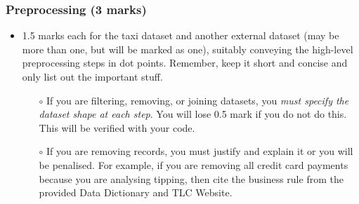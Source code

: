 \documentclass[12pt]{article}
\begin{document}
\subsubsection*{Preprocessing (3 marks)}
\begin{itemize} 
    \item 1.5 marks each for the taxi dataset and another external dataset (may be more than one, but will be marked as one), suitably conveying the high-level preprocessing steps in dot points. Remember, keep it short and concise and only list out the important stuff.
    \begin{itemize}
        \item[$\circ$] If you are filtering, removing, or joining datasets, you \emph{must specify the dataset shape at each step}. You will lose 0.5 mark if you do not do this. This will be verified with your code.
        \item[$\circ$] If you are removing records, you must justify and explain it or you will be penalised. For example, if you are removing all credit card payments because you are analysing tipping, then cite the business rule from the provided Data Dictionary and TLC Website.
    \end{itemize}
\end{itemize}
\end{document}
